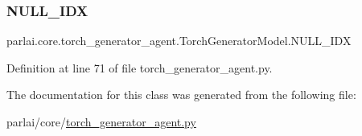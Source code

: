 \subsubsection{\texorpdfstring{N\+U\+L\+L\+\_\+\+I\+DX}{NULL\_IDX}}
{\footnotesize\ttfamily parlai.\+core.\+torch\+\_\+generator\+\_\+agent.\+Torch\+Generator\+Model.\+N\+U\+L\+L\+\_\+\+I\+DX}



Definition at line 71 of file torch\+\_\+generator\+\_\+agent.\+py.



The documentation for this class was generated from the following file\+:\begin{DoxyCompactItemize}
\item 
parlai/core/\hyperlink{torch__generator__agent_8py}{torch\+\_\+generator\+\_\+agent.\+py}\end{DoxyCompactItemize}
